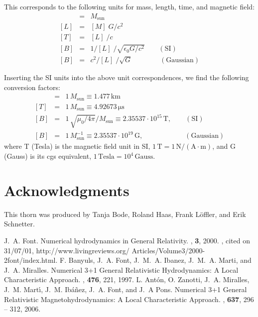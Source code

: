 This corresponds to the following units for mass, length, time, and
magnetic field:
\begin{eqnarray}
  [M] & = & M_{\mathrm{sun}}
  \\{}
  [L] & = & [M]\; G/c^2
  \\{}
  [T] & = & [L]\; / c
  \\{}
  [B] & = & 1/[L]\; / \sqrt{\epsilon_0 G / c^2} \qquad (\mathrm{SI})
  \\{}
  [B] & = & c^2/[L]\; / \sqrt{G} \qquad \qquad (\mathrm{Gaussian})
\end{eqnarray}

Inserting the SI units into the above unit correspondences, 
we find the following conversion factors:
\begin{eqnarray}
  [L] & = & 1\, M_{\mathrm{sun}} \equiv 1.477\, \mathrm{km}
  \\{}
  [T] & = & 1\, M_{\mathrm{sun}} \equiv 4.92673\, \mathrm{\mu s}
  \\{}
  [B] & = & 1\, \sqrt{\mu_0/4\pi} /M_{\mathrm{sun}} \equiv 2.35537\cdot 
            10^{15}\, \mathrm{T},  \qquad (\mathrm{SI})
  \\{}
  [B] & = & 1\, M^{-1}_{\mathrm{sun}} \equiv 2.35537\cdot 10^{19}\, \mathrm{G}, 
            \qquad \qquad \qquad (\mathrm{Gaussian})
\end{eqnarray}
where T (Tesla) is the magnetic field unit in SI, 
$1\,\mathrm{T}=1\,\mathrm{N/(A\cdot m)}$, and G (Gauss) is its cgs equivalent,
$1\,\mathrm{Tesla} = 10^4\,\mathrm{Gauss}$. 


\section{Acknowledgments}

This thorn was produced by Tanja Bode, Roland Haas, Frank L\"offler, and Erik Schnetter.

\begin{thebibliography}{9}
    J.~A. Font.
    \newblock Numerical hydrodynamics in {G}eneral {R}elativity.
    , {\bf 3}, 2000.
    , cited on 31/07/01,
      http://www.livingreviews.org/ Articles/Volume3/2000-2font/index.html.
    F. Banyuls, J.~A. Font, J.~M.~A. Ibanez, J.~M.~A. Marti, and 
	J.~A. Miralles. 
    \newblock Numerical 3+1 General Relativistic Hydrodynamics: A Local Characteristic Approach.
    , {\bf 476}, 221, 1997.
    L. Ant{\'o}n, O. Zanotti, J.~A. Miralles,  
	J.~M. Mart{\'{\i}}, J.~M. Ib{\'a}{\~n}ez, J.~A. Font, and 
	 J.~A Pons.
    \newblock Numerical 3+1 General Relativistic Magnetohydrodynamics: A Local Characteristic Approach.
    , {\bf 637}, 296 -- 312, 2006.
\end{thebibliography}



